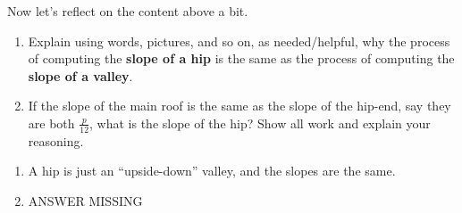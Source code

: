 \documentclass[hints,nooutcomes,noauthor,handout]{ximera}
\begin{document}
\begin{question}
  Now let's reflect on the content above a bit.
  \begin{enumerate}
    \item Explain using words, pictures, and so on, as needed/helpful,
      why the process of computing the \textbf{slope of a hip} is the same as the process of computing the
      \textbf{slope of a valley}.
    \item If the slope of the main roof is the same as the slope of the
    hip-end, say they are both $\frac{p}{12}$, what is the slope of
    the hip? Show all work and explain your reasoning.
  \end{enumerate}
  \begin{freeResponse}
    \begin{enumerate}
  \item A hip is just an ``upside-down'' valley, and the slopes are
    the same.
  \item ANSWER MISSING
    \end{enumerate}
  \end{freeResponse}
\end{question}
\end{document}
